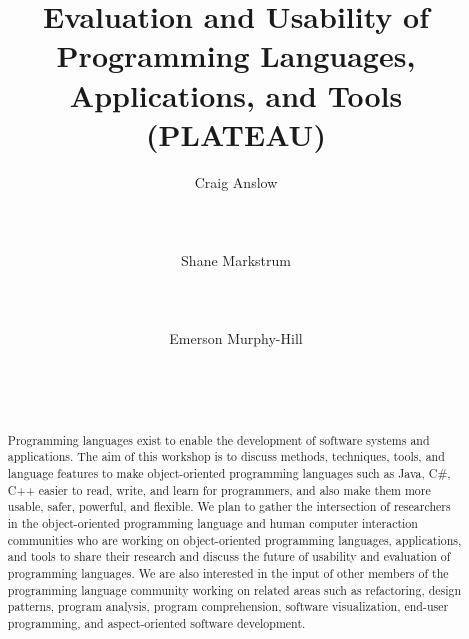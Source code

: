 \documentclass{acm_proc_article-sp}
\begin{document}
\title{Evaluation and Usability of Programming Languages, Applications, and Tools  (PLATEAU)}

\author{
\alignauthor Craig Anslow\\
       \\
       \\
       \\
\alignauthor Shane Markstrum\\
       \\
       \\
       \\
\alignauthor Emerson Murphy-Hill\\
       \\
       \\
       \\
       }

\date{}

\maketitle
\begin{abstract}
 
Programming languages exist to enable the development of software systems and applications. The aim of this workshop is to discuss methods, techniques, tools, and language features to make object-oriented programming languages such as Java, C\#, C++ easier to read, write, and learn for programmers, and also make them more usable, safer, powerful, and flexible. We plan to gather the intersection of researchers in the object-oriented programming language and human computer interaction communities who are working on object-oriented programming languages, applications, and tools to share their research and discuss the future of usability and evaluation of programming languages. We are also interested in the input of other members of the programming language community working on related areas such as refactoring, design patterns, program analysis, program comprehension, software visualization, end-user programming, and aspect-oriented software development.

\end{abstract}
\end{document}
